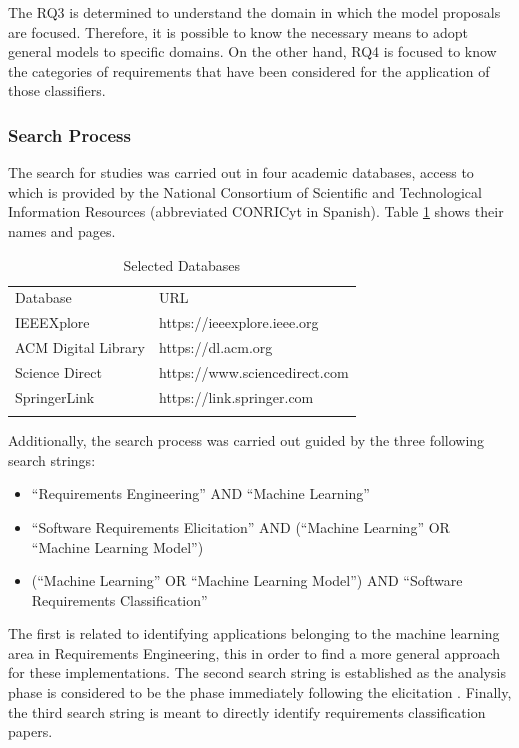 \documentclass[conference]{IEEEtran}
\newcommand{\quotes}[1]{``#1''}
\begin{document}
The RQ3 is determined to understand the domain in which the model proposals are focused. Therefore, it is possible to know the necessary means to adopt general models to specific domains. On the other hand, RQ4 is focused to know the categories of requirements that have been considered for the application of those classifiers.

\subsubsection{Search Process}

The search for studies was carried out in four academic databases, access to which is provided by the National Consortium of Scientific and Technological Information Resources (abbreviated CONRICyt in Spanish). Table \ref{tab:selected-databases} shows their names and pages.

\begin{table}[!htbp]
\caption{Selected Databases}
\label{tab:selected-databases}       %
\begin{tabular}{p{4cm}p{4cm}}
\hline\noalign{\smallskip}
Database & URL  \\
\noalign{\smallskip}\hline\noalign{\smallskip}
IEEEXplore & https://ieeexplore.ieee.org \\
ACM Digital Library & https://dl.acm.org \\
Science Direct & https://www.sciencedirect.com \\
SpringerLink & https://link.springer.com \\
\noalign{\smallskip}\hline
\end{tabular}
\end{table}

Additionally, the search process was carried out guided by the three following search strings: 

\begin{itemize}
  \item\quotes{Requirements Engineering} AND \quotes{Machine Learning}
  \item\quotes{Software Requirements Elicitation} AND (\quotes{Machine Learning} OR \quotes{Machine Learning Model})
  \item(\quotes{Machine Learning} OR \quotes{Machine Learning Model}) AND \quotes{Software Requirements Classification}
\end{itemize}

The first is related to identifying applications belonging to the machine learning area in Requirements Engineering, this in order to find a more general approach for these implementations. The second search string is established as the analysis phase is considered to be the phase immediately following the elicitation \cite{Wiegers2013}. Finally, the third search string is meant to directly identify requirements classification papers.
\end{document}
